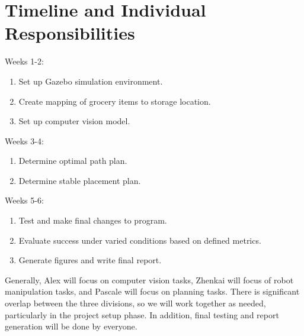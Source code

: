 \documentclass{article}
\begin{document}



\section{Timeline and Individual Responsibilities}
\noindent Weeks 1-2:
\begin{enumerate}
    \item Set up Gazebo simulation environment.
    \item Create mapping of grocery items to storage location.
    \item Set up computer vision model.
\end{enumerate}
Weeks 3-4:
\begin{enumerate}
    \item Determine optimal path plan.
    \item Determine stable placement plan.
\end{enumerate}
Weeks 5-6:
\begin{enumerate}
    \item Test and make final changes to program.
    \item Evaluate success under varied conditions based on defined metrics.
    \item Generate figures and write final report.
\end{enumerate}

\noindent Generally, Alex will focus on computer vision tasks, Zhenkai will focus of robot manipulation tasks, and Pascale will focus on planning tasks. There is significant overlap between the three divisions, so we will work together as needed, particularly in the project setup phase. In addition, final testing and report generation will be done by everyone.



\end{document}
